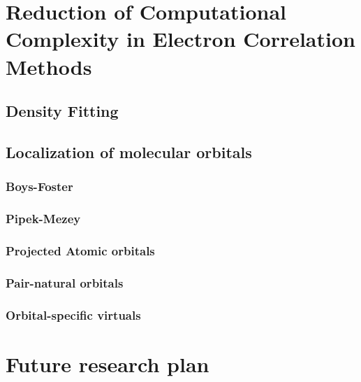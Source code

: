 \documentclass[journal=jacsat]{achemso}
\numberwithin{equation}{section}
\begin{document}
\section{Reduction of Computational Complexity in Electron Correlation Methods}

\subsection{Density Fitting}

\subsection{Localization of molecular orbitals}
     
\subsubsection{Boys-Foster}

\subsubsection{Pipek-Mezey}

\subsubsection{Projected Atomic orbitals}

\subsubsection{Pair-natural orbitals}

\subsubsection{Orbital-specific virtuals}

\section{Future research plan}
\end{document}
